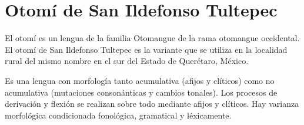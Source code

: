 \section*{Otomí de San Ildefonso Tultepec}

\noindent El otomí es un lengua de la familia Otomangue de la rama otomangue occidental. El otomí de San Ildefonso Tultepec es la variante que se utiliza en la localidad rural del mismo nombre en el sur del Estado de Querétaro, México.

Es una lengua con morfología tanto acumulativa (afijos y clíticos) como no acumulativa (mutaciones consonánticas y cambios tonales). Los procesos de derivación y flexión se realizan sobre todo mediante afijos y clíticos. Hay varianza morfológica condicionada fonológica, gramatical y léxicamente. \vspace{0.5cm}

